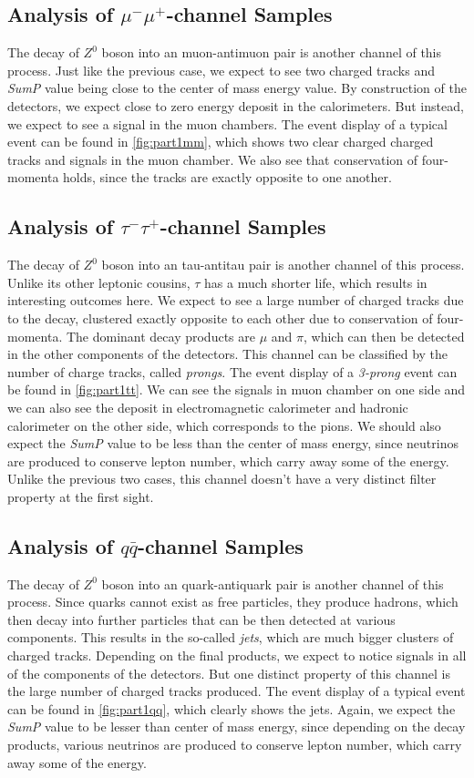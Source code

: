 \subsection{Analysis of $\mu^-\mu^+$-channel Samples}
The decay of $Z^0$ boson into an muon-antimuon pair is another channel of this process. Just like the previous case, we expect to see two charged tracks and \textit{SumP} value being close to the center of mass energy value. By construction of the detectors, we expect close to zero energy deposit in the calorimeters. But instead, we expect to see a signal in the muon chambers. The event display of a typical event can be found in \ref{fig:part1mm}, which shows two clear charged charged tracks and signals in the muon chamber. We also see that conservation of four-momenta holds, since the tracks are exactly opposite to one another.

\subsection{Analysis of $\tau^-\tau^+$-channel Samples}
The decay of $Z^0$ boson into an tau-antitau pair is another channel of this process. Unlike its other leptonic cousins, $\tau$ has a much shorter life, which results in interesting outcomes here. We expect to see a large number of charged tracks due to the decay, clustered exactly opposite to each other due to conservation of four-momenta. The dominant decay products are $\mu$ and $\pi$, which can then be detected in the other components of the detectors. This channel can be classified by the number of charge tracks, called \textit{prongs}. The event display of a \textit{3-prong} event can be found in \ref{fig:part1tt}. We can see the signals in muon chamber on one side and we can also see the deposit in electromagnetic calorimeter and hadronic calorimeter on the other side, which corresponds to the pions. We should also expect the \textit{SumP} value to be less than the center of mass energy, since neutrinos are produced to conserve lepton number, which carry away some of the energy. Unlike the previous two cases, this channel doesn't have a very distinct filter property at the first sight.

\subsection{Analysis of $q\bar{q}$-channel Samples}
The decay of $Z^0$ boson into an quark-antiquark pair is another channel of this process. Since quarks cannot exist as free particles, they produce hadrons, which then decay into further particles that can be then detected at various components. This results in the so-called \textit{jets}, which are much bigger clusters of charged tracks. Depending on the final products, we expect to notice signals in all of the components of the detectors. But one distinct property of this channel is the large number of charged tracks produced. The event display of a typical event can be found in \ref{fig:part1qq}, which clearly shows the jets. Again, we expect the \textit{SumP} value to be lesser than center of mass energy, since depending on the decay products, various neutrinos are produced to conserve lepton number, which carry away some of the energy.

